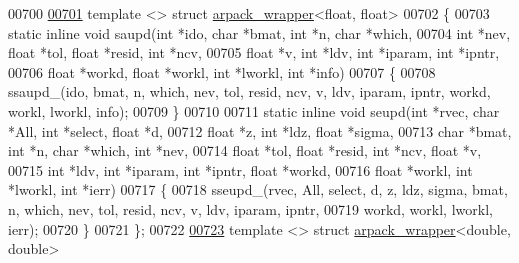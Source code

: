 \begin{DoxyCode}
00700 
\hyperlink{struct_eigen_1_1internal_1_1arpack__wrapper_3_01float_00_01float_01_4}{00701} \textcolor{keyword}{template} <> \textcolor{keyword}{struct }\hyperlink{struct_eigen_1_1internal_1_1arpack__wrapper}{arpack\_wrapper}<float, float>
00702 \{
00703   \textcolor{keyword}{static} \textcolor{keyword}{inline} \textcolor{keywordtype}{void} saupd(\textcolor{keywordtype}{int} *ido, \textcolor{keywordtype}{char} *bmat, \textcolor{keywordtype}{int} *n, \textcolor{keywordtype}{char} *which,
00704       \textcolor{keywordtype}{int} *nev, \textcolor{keywordtype}{float} *tol, \textcolor{keywordtype}{float} *resid, \textcolor{keywordtype}{int} *ncv,
00705       \textcolor{keywordtype}{float} *v, \textcolor{keywordtype}{int} *ldv, \textcolor{keywordtype}{int} *iparam, \textcolor{keywordtype}{int} *ipntr,
00706       \textcolor{keywordtype}{float} *workd, \textcolor{keywordtype}{float} *workl, \textcolor{keywordtype}{int} *lworkl, \textcolor{keywordtype}{int} *info)
00707   \{
00708     ssaupd\_(ido, bmat, n, which, nev, tol, resid, ncv, v, ldv, iparam, ipntr, workd, workl, lworkl, info);
00709   \}
00710 
00711   \textcolor{keyword}{static} \textcolor{keyword}{inline} \textcolor{keywordtype}{void} seupd(\textcolor{keywordtype}{int} *rvec, \textcolor{keywordtype}{char} *All, \textcolor{keywordtype}{int} *select, \textcolor{keywordtype}{float} *d,
00712       \textcolor{keywordtype}{float} *z, \textcolor{keywordtype}{int} *ldz, \textcolor{keywordtype}{float} *sigma,
00713       \textcolor{keywordtype}{char} *bmat, \textcolor{keywordtype}{int} *n, \textcolor{keywordtype}{char} *which, \textcolor{keywordtype}{int} *nev,
00714       \textcolor{keywordtype}{float} *tol, \textcolor{keywordtype}{float} *resid, \textcolor{keywordtype}{int} *ncv, \textcolor{keywordtype}{float} *v,
00715       \textcolor{keywordtype}{int} *ldv, \textcolor{keywordtype}{int} *iparam, \textcolor{keywordtype}{int} *ipntr, \textcolor{keywordtype}{float} *workd,
00716       \textcolor{keywordtype}{float} *workl, \textcolor{keywordtype}{int} *lworkl, \textcolor{keywordtype}{int} *ierr)
00717   \{
00718     sseupd\_(rvec, All, select, d, z, ldz, sigma, bmat, n, which, nev, tol, resid, ncv, v, ldv, iparam, 
      ipntr,
00719         workd, workl, lworkl, ierr);
00720   \}
00721 \};
00722 
\hyperlink{struct_eigen_1_1internal_1_1arpack__wrapper_3_01double_00_01double_01_4}{00723} \textcolor{keyword}{template} <> \textcolor{keyword}{struct }\hyperlink{struct_eigen_1_1internal_1_1arpack__wrapper}{arpack\_wrapper}<double, double>

\end{DoxyCode}
